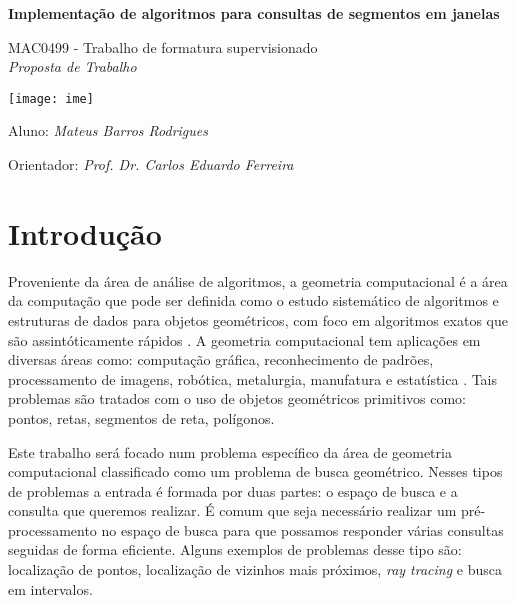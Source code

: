 \documentclass[10pt,twoside,a4paper]{article}
\begin{document}
\begin{center}
  \vspace*{3cm}
  
  \Huge
  \textbf{Implementação de algoritmos para consultas de segmentos em janelas}

  \vspace{2.5cm}
  \LARGE
  MAC0499 - Trabalho de formatura supervisionado\\
  \vspace{0.3cm}
  \LARGE
  \textit{Proposta de Trabalho}

  
  \vspace{4.3cm}
  \texttt{[image: ime]}
  \vspace{2cm}
  
  Aluno: \textit{Mateus Barros Rodrigues}
  
  
  Orientador: \textit{Prof. Dr. Carlos Eduardo Ferreira}
  
  \vspace{0.8cm}
  
  \Large
  
\end{center}


\newpage
\tableofcontents
\newpage
\section{Introdução}
\doublespacing
Proveniente da área de análise de algoritmos, a geometria computacional é a área da computação que pode ser definida como o estudo sistemático de algoritmos e estruturas de dados para objetos geométricos, com foco em algoritmos exatos que são assintóticamente rápidos \cite{dbvkos}. A geometria computacional tem aplicações em diversas áreas como: computação gráfica, reconhecimento de padrões, processamento de imagens, robótica, metalurgia, manufatura e estatística \cite{cormen}. Tais problemas são tratados com o uso de objetos geométricos primitivos como: pontos, retas, segmentos de reta, polígonos.
\par Este trabalho será focado num problema específico da área de geometria computacional classificado como um problema de busca geométrico. Nesses tipos de problemas a entrada é formada por duas partes: o espaço de busca e a consulta que queremos realizar. É comum que seja necessário realizar um pré-processamento no espaço de busca para que possamos responder várias consultas seguidas de forma eficiente. Alguns exemplos de problemas desse tipo são: localização de pontos, localização de vizinhos mais próximos, \textit{ray tracing} e busca em intervalos.
\end{document}
